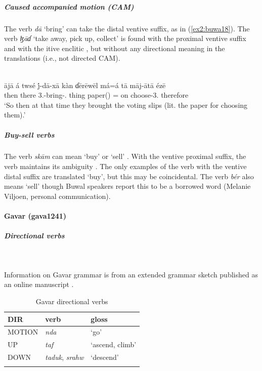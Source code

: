 \subparagraph{Caused accompanied motion (CAM)}

The verb \textit{dā} `bring' can take the distal ventive suffix, as in (\ref{ex2:buwa18}). The verb \textit{ɮāɗ} `take away, pick up, collect' is found with the proximal ventive suffix and with the itive enclitic \citep[24, 151, 168, 179]{viljoenBuwalNarrativeDiscourse2015}, but without any directional meaning in the translations (i.e., not directed CAM). 

\ea\label{ex2:buwa18}
 \\
\gll  ājā á twsé j́-dā-xā kàn ɗērēwēl má=á tā māj-ātā ézē \\
then  there 3.-bring-. thing paper() = on choose-3. therefore \\
\glt `So then at that time they brought the voting slips (lit. the paper for choosing them).'
\z 

\subparagraph{Buy-sell verbs}

The verb \textit{skām} can mean `buy' or `sell' \citep[379]{viljoenGrammaticalDescriptionBuwal2013}. With the ventive proximal suffix, the verb maintains its ambiguity \citep[330, 374, 571]{viljoenGrammaticalDescriptionBuwal2013}. The only examples of the verb with the ventive distal suffix are translated `buy', but this may be coincidental. The verb \textit{bér} also means `sell' though Buwal speakers report this to be a borrowed word (Melanie Viljoen, personal communication). 

\paragraph*{Gavar (gava1241)} \label{gava}

\subparagraph{Directional verbs}~

Information on Gavar grammar is from an extended grammar sketch published as an online manuscript \citep{viljoenGavarVerbPhrase2017}.

\begin{table}[H]
	\caption{Gavar directional verbs} 
	\label{tab:gavaV}
	\begin{tabular}{lll} %
		\lsptoprule
		DIR & verb & gloss   \\ %
		\midrule
		MOTION & \textit{nda} & `go' \\
		UP & \textit{taf} & `ascend, climb' \\
		DOWN & \textit{taduk}, \textit{srahw} & `descend' \\
		\lspbottomrule
	\end{tabular}
\end{table}

